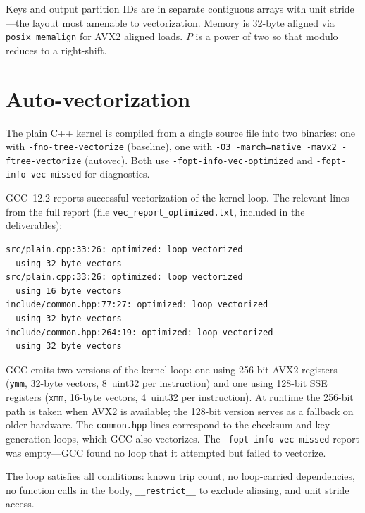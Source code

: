 \documentclass[10pt,a4paper,twocolumn]{article}
\begin{document}
Keys and output partition IDs are in separate contiguous arrays with unit stride---the layout most amenable to vectorization. Memory is 32-byte aligned via \texttt{posix\_memalign} for AVX2 aligned loads. $P$ is a power of two so that modulo reduces to a right-shift.

\section{Auto-vectorization}

The plain C++ kernel is compiled from a single source file into two binaries: one with \texttt{-fno-tree-vectorize} (baseline), one with \texttt{-O3 -march=native -mavx2 -ftree-vectorize} (autovec). Both use \texttt{-fopt-info-vec-optimized} and \texttt{-fopt-info-vec-missed} for diagnostics.

GCC~12.2 reports successful vectorization of the kernel loop. The relevant lines from the full report (file \texttt{vec\_report\_optimized.txt}, included in the deliverables):

\begin{lstlisting}
src/plain.cpp:33:26: optimized: loop vectorized
  using 32 byte vectors
src/plain.cpp:33:26: optimized: loop vectorized
  using 16 byte vectors
include/common.hpp:77:27: optimized: loop vectorized
  using 32 byte vectors
include/common.hpp:264:19: optimized: loop vectorized
  using 32 byte vectors
\end{lstlisting}

GCC emits two versions of the kernel loop: one using 256-bit AVX2 registers (\texttt{ymm}, 32-byte vectors, 8~uint32 per instruction) and one using 128-bit SSE registers (\texttt{xmm}, 16-byte vectors, 4~uint32 per instruction). At runtime the 256-bit path is taken when AVX2 is available; the 128-bit version serves as a fallback on older hardware. The \texttt{common.hpp} lines correspond to the checksum and key generation loops, which GCC also vectorizes. The \texttt{-fopt-info-vec-missed} report was empty---GCC found no loop that it attempted but failed to vectorize.

The loop satisfies all conditions: known trip count, no loop-carried dependencies, no function calls in the body, \texttt{\_\_restrict\_\_} to exclude aliasing, and unit stride access.

\end{document}
